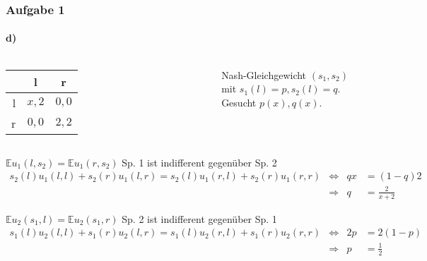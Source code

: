 \documentclass{beamer}
\newcommand{\E}{\mathbb{E}}
\begin{document}
\begin{frame}
\frametitle{Aufgabe 1}
\framesubtitle{d)}

\begin{columns}[c]
\centering
\begin{tabular}{r|c|c|}
    & l & r \\
    \hline
l & $x, 2$ & $0, 0$ \\
r & $0, 0$ & $2, 2$ \\
    \hline
\end{tabular}

Nash-Gleichgewicht $(s_1, s_2)$ mit $s_1(l) = p, s_2(l) = q$.\\
Gesucht $p(x), q(x)$.
\end{columns}

\begin{block}{$\E u_1(l, s_2) = \E u_1(r, s_2)$ \hfill Sp. 1 ist indifferent gegenüber Sp. 2}
\begin{align*}
s_2(l)u_1(l,l) + s_2(r)u_1(l,r) = s_2(l)u_1(r,l) + s_2(r)u_1(r,r)
& \Leftrightarrow & 
qx & = (1-q)2 \\
& \Rightarrow &
q & = \frac{2}{x+2}
\end{align*}
\end{block}

\begin{block}{$\E u_2(s_1, l) = \E u_2(s_1, r)$ \hfill Sp. 2 ist indifferent gegenüber Sp. 1}
\begin{align*}
s_1(l)u_2(l,l) + s_1(r)u_2(l,r) = s_1(l)u_2(r,l) + s_1(r)u_2(r,r)
& \Leftrightarrow &
2p& = 2(1-p) \\
& \Rightarrow &
p & = \frac{1}{2}
\end{align*}
\end{block}

\end{frame}
\end{document}
